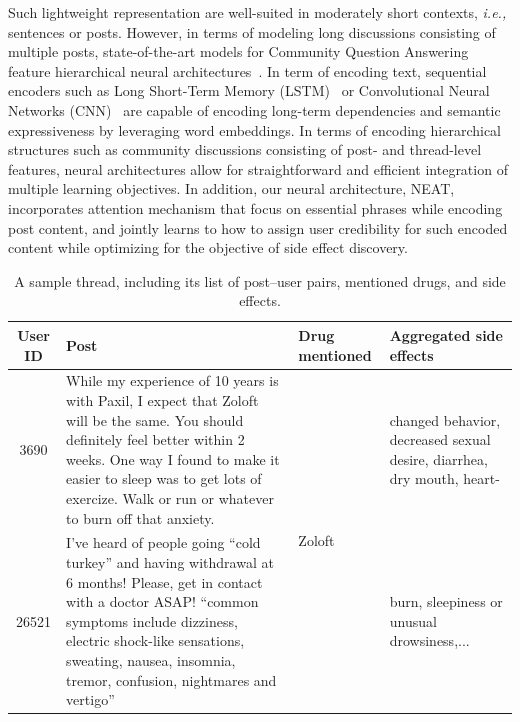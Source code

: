 \documentclass{bmcart}
\begin{document}
Such lightweight representation are well-suited in moderately short contexts, \textit{i.e.,} sentences or posts. However, in terms of modeling long discussions consisting of multiple posts, state-of-the-art models for
Community Question Answering feature hierarchical neural architectures~\cite{qiu2015convolutional,zhou2018recurrent,zhang2017attentive}. In term of encoding text, sequential encoders such as 
Long Short-Term Memory (LSTM)~\cite{hochreiter1997long} or Convolutional Neural Networks (CNN)~\cite{kim2014convolutional} are capable of encoding long-term dependencies and semantic expressiveness by leveraging word embeddings. In terms of encoding hierarchical structures such as community discussions consisting of post- and thread-level features, neural architectures allow for straightforward and efficient integration of multiple learning objectives. In addition, our neural architecture, NEAT, incorporates attention mechanism that focus on essential phrases while encoding post content, and jointly learns to how to assign user credibility for such encoded content while optimizing for the objective of side effect discovery.

\begin{table}[t!]
  \centering
  \captionsetup{justification=centering}
  \footnotesize
  \begin{tabular}{|c||p{7cm}|p{1cm}|p{2cm}|}
    \hline
	User ID & Post & Drug mentioned & Aggregated side effects\\ \hline \hline
	3690 & While my experience of 10 years is with Paxil, I expect that Zoloft will be the same. You should definitely feel better within 2 weeks. One way I found to make it easier to sleep was to get lots of exercize. Walk or run or whatever to burn off that anxiety. & \multirow{2}{*}{Zoloft} & changed behavior, decreased sexual desire, diarrhea, dry mouth, heart-  \\ \cline{1-2}
        26521 & I've heard of people going ``cold turkey'' and having withdrawal at 6 months! Please, get in contact with a doctor ASAP! ``common symptoms include dizziness, electric shock-like sensations, sweating, nausea, insomnia, tremor, confusion, nightmares and vertigo'' &  & burn, sleepiness or unusual drowsiness,... \\ \hline
  \end{tabular} 
  \caption{A sample thread, including its list of post--user pairs, mentioned drugs, and side effects.}
  \label{sample_thread}
\end{table}
\end{document}
